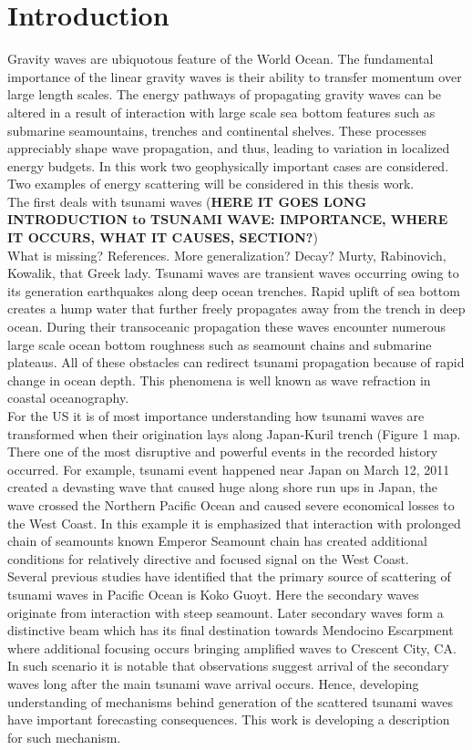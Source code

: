 \section{Introduction}
Gravity waves are ubiquotous feature of the World Ocean. The fundamental importance of the linear gravity waves is their ability to transfer momentum over large length scales. The energy pathways of propagating gravity waves can be altered in a result of interaction with large scale sea bottom features such as submarine seamountains, trenches and continental shelves. These processes appreciably shape wave propagation, and thus, leading to variation in localized energy budgets. In this work two geophysically important cases are considered. Two examples of energy scattering will be considered in this thesis work.\\
The first deals with tsunami waves (\textbf{HERE IT GOES LONG INTRODUCTION to TSUNAMI WAVE: IMPORTANCE, WHERE IT OCCURS, WHAT IT CAUSES, SECTION?})\\
What is missing? References. More generalization? Decay? Murty, Rabinovich, Kowalik, that Greek lady.
Tsunami waves are transient waves occurring owing to its generation earthquakes along deep ocean trenches. Rapid uplift of sea bottom creates a hump water that further freely propagates away from the trench in deep ocean. During their transoceanic propagation these waves encounter numerous large scale ocean bottom roughness such as seamount chains and submarine plateaus. All of these obstacles can redirect tsunami propagation because of rapid change in ocean depth. This phenomena is well known as wave refraction in coastal oceanography.\\
For the US it is of most importance understanding how tsunami waves are transformed when their origination lays along Japan-Kuril trench (Figure 1 map. There one of the most disruptive and powerful events in the recorded history occurred. For example, tsunami event happened near Japan on March 12, 2011 created a devasting wave that caused huge along shore run ups in Japan, the wave crossed the Northern Pacific Ocean and caused severe economical losses to the West Coast. In this example it is emphasized that interaction with prolonged chain of seamounts known Emperor Seamount chain has created additional conditions for relatively directive and focused signal on the West Coast.\\
Several previous studies have identified that the primary source of scattering of tsunami waves in Pacific Ocean is Koko Guoyt. Here the secondary waves originate from interaction with steep seamount. Later secondary waves form a distinctive beam which has its final destination towards Mendocino Escarpment where additional focusing occurs bringing amplified waves to Crescent City, CA. In such scenario it is notable that observations suggest arrival of the secondary waves long after the main tsunami wave arrival occurs. Hence, developing understanding of mechanisms behind generation of the scattered tsunami waves have important forecasting consequences. This work is developing a description for such mechanism.\\

